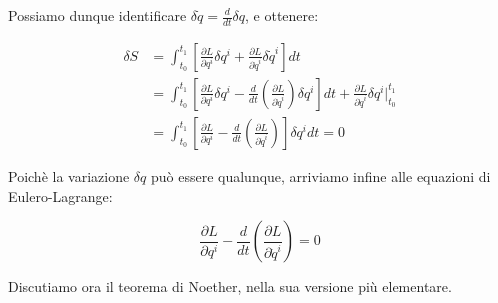 \documentclass{report}
\begin{document}
Possiamo dunque identificare $\delta \dot{q} = \frac{d}{dt}\delta q$, e ottenere: 

\begin{align}
    \delta S &= \int_{t_0}^{t_1} \left[ \frac{\partial L}{\partial q^i}\delta q^i + \frac{\partial L}{\partial \dot{q}^i}\delta \dot{q}^i \right]dt \\ &= \int_{t_0}^{t_1} \left[ \frac{\partial L}{\partial q^i}\delta q^i - \frac{d}{dt}\left(\frac{\partial L}{\partial \dot{q}^i}\right)\delta q^i \right] dt + \frac{\partial L}{\partial \dot{q}^i}\delta q^i \biggr|_{t_0}^{t_1} \\ &= \int_{t_0}^{t_1} \left[ \frac{\partial L}{\partial q^i} - \frac{d}{dt}\left(\frac{\partial L}{\partial \dot{q}^i}\right) \right]\delta q^i dt = 0
\end{align}

Poichè la variazione $\delta q$ può essere qualunque, arriviamo infine alle equazioni di Eulero-Lagrange: 

\begin{tcolorbox}[colback=doc!10, colframe=black, boxrule=1pt]
    \begin{equation}
    \frac{\partial L}{\partial q^i} - \frac{d}{dt}\left(\frac{\partial L}{\partial \dot{q}^i}\right) = 0
    \end{equation}
\end{tcolorbox}


Discutiamo ora il teorema di Noether, nella sua versione più elementare.

\end{document}
